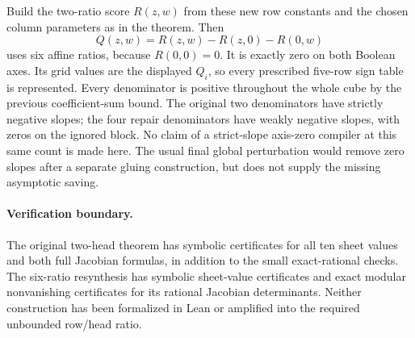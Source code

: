 \documentclass[11pt]{article}
\begin{document}
Build the two-ratio score $R(z,w)$ from these new row constants and
the chosen column parameters as in the theorem. Then
\[
 Q(z,w)=R(z,w)-R(z,0)-R(0,w)
\]
uses six affine ratios, because $R(0,0)=0$. It is exactly zero on
both Boolean axes. Its grid values are the displayed $Q_i$, so every
prescribed five-row sign table is represented. Every denominator is
positive throughout the whole cube by the previous coefficient-sum
bound. The original two denominators have strictly negative slopes;
the four repair denominators have weakly negative slopes, with zeros
on the ignored block. No claim of a strict-slope axis-zero compiler
at this same count is made here. The usual final global perturbation
would remove zero slopes after a separate gluing construction, but
does not supply the missing asymptotic saving.

\paragraph{Verification boundary.}
The original two-head theorem has symbolic certificates for all ten
sheet values and both full Jacobian formulas, in addition to the
small exact-rational checks. The six-ratio resynthesis has symbolic
sheet-value certificates and exact modular nonvanishing certificates
for its rational Jacobian determinants. Neither construction has been
formalized in Lean or amplified into the required unbounded row/head
ratio.
\end{document}
